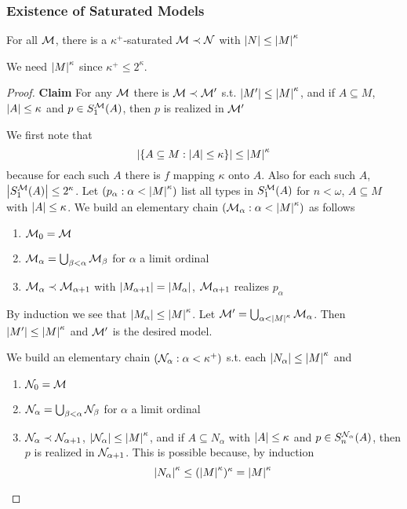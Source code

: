 \documentclass[11pt]{article}
\begin{document}
\subsubsection{Existence of Saturated Models}
\label{sec:org65fd45d}
\begin{theorem}[]
\label{thm4.3.12}
For all \(\mathcal{M}\), there is a \(\kappa^+\)-saturated \(\mathcal{M}\prec\mathcal{N}\) with \(\abs{N}\le\abs{M}^\kappa\)
\end{theorem}

We need \(\abs{M}^\kappa\) since \(\kappa^+\le 2^\kappa\).

\begin{proof}
\textbf{Claim} For any \(\mathcal{M}\) there is \(\mathcal{M}\prec\mathcal{M}'\) s.t. \(\abs{M'}\le\abs{M}^\kappa\), and if \(A\subseteq M\), \(\abs{A}\le\kappa\)
and \(p\in S_1^{\mathcal{M}}(A)\), then \(p\) is realized in \(\mathcal{M}'\)

We first note that
\begin{equation*}
\abs{\{A\subseteq M:\abs{A}\le\kappa\}}\le\abs{M}^\kappa
\end{equation*}
because for each such \(A\) there is \(f\) mapping \(\kappa\) onto \(A\). Also for each
such \(A\), \(\abs{S_1^{\calm}(A)}\le 2^\kappa\). Let \((p_\alpha:\alpha<\abs{M}^\kappa)\) list all types in \(S_1^{\mathcal{M}}(A)\)
for \(n<\omega\), \(A\subseteq M\) with \(\abs{A}\le\kappa\). We build an elementary chain \((\calm_\alpha:\alpha<\abs{M}^\kappa)\) as
follows
\begin{enumerate}
\item \(\mathcal{M}_0=\mathcal{M}\)
\item \(\mathcal{M}_\alpha=\bigcup_{\beta<\alpha}\mathcal{M}_\beta\) for \(\alpha\) a limit ordinal
\item \(\mathcal{M}_\alpha\prec\mathcal{M}_{\alpha+1}\) with \(\abs{M_{\alpha+1}}=\abs{M_\alpha}\), \(\mathcal{M}_{\alpha+1}\) realizes \(p_\alpha\)
\end{enumerate}


By induction we see that \(\abs{M_\alpha}\le\abs{M}^\kappa\). Let \(\calm'=\bigcup_{\alpha<\abs{M}^\kappa}\calm_\alpha\).
Then \(\abs{M'}\le\abs{M}^\kappa\) and \(\mathcal{M}'\) is the desired model.

We build an elementary chain \((\mathcal{N}_\alpha:\alpha<\kappa^+)\) s.t. each \(\abs{N_\alpha}\le\abs{M}^\kappa\) and
\begin{enumerate}
\item \(\mathcal{N}_0=\mathcal{M}\)
\item \(\mathcal{N}_\alpha=\bigcup_{\beta<\alpha}\mathcal{N}_\beta\) for \(\alpha\) a limit ordinal
\item \(\mathcal{N}_\alpha\prec\mathcal{N}_{\alpha+1}\), \(\abs{\caln_\alpha}\le\abs{M}^\kappa\), and if \(A\subseteq N_\alpha\) with \(\abs{A}\le\kappa\)
and \(p\in S_n^{\mathcal{N}_\alpha}(A)\), then \(p\) is realized in \(\mathcal{N}_{\alpha+1}\). This is possible because, by
induction
\begin{equation*}
\abs{N_\alpha}^\kappa\le(\abs{M}^\kappa)^\kappa=\abs{M}^\kappa
\end{equation*}
\end{enumerate}



\end{proof}
\end{document}
